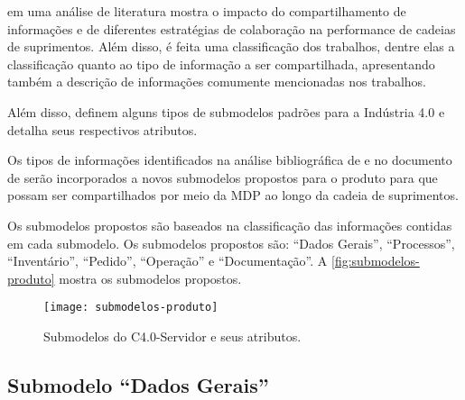  em uma análise de literatura mostra o impacto do compartilhamento de informações e de diferentes estratégias de colaboração na performance de cadeias de suprimentos. Além disso, é feita uma classificação dos trabalhos, dentre elas a classificação quanto ao tipo de informação a ser compartilhada, apresentando também a descrição de informações comumente mencionadas nos trabalhos.

Além disso,  definem alguns tipos de submodelos padrões para a Indústria 4.0 e detalha seus respectivos atributos.

Os tipos de informações identificados na análise bibliográfica de  e no documento de  serão incorporados a novos submodelos propostos para o produto para que possam ser compartilhados por meio da MDP ao longo da cadeia de suprimentos.

Os submodelos propostos são baseados na classificação das informações contidas em cada submodelo. Os submodelos propostos são: ``Dados Gerais'', ``Processos'', ``Inventário'', ``Pedido'', ``Operação'' e ``Documentação''. A \autoref{fig:submodelos-produto} mostra os submodelos propostos.

\begin{figure}[htb!]
	\centering
	\texttt{[image: submodelos-produto]}
	\caption{Submodelos do C4.0-Servidor e seus atributos.}
	\label{fig:submodelos-produto}
\end{figure}



\subsection{Submodelo ``Dados Gerais''}

